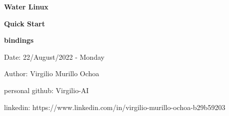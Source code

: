 \begin{center}

	\huge\textbf{
		Water Linux
	}\linebreak[4]

	\huge\textbf{
		Quick Start
	}\linebreak[4]


	\LARGE\textbf{
		bindings
	}\linebreak[4]
	\newline
	\newline
	\newline
	\newline
	\begin{LARGE}

\color{blue}

	Date: 22/August/2022 - Monday

	Author: Virgilio Murillo Ochoa

	personal github: Virgilio-AI

	linkedin: https://www.linkedin.com/in/virgilio-murillo-ochoa-b29b59203

\color{blue}

	\end{LARGE}
\end{center}
\newpage

